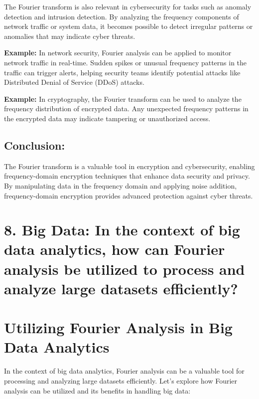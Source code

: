 \documentclass[11pt]{article}
\begin{document}
The Fourier transform is also relevant in cybersecurity for tasks such
as anomaly detection and intrusion detection. By analyzing the frequency
components of network traffic or system data, it becomes possible to
detect irregular patterns or anomalies that may indicate cyber threats.

\textbf{Example:} In network security, Fourier analysis can be applied
to monitor network traffic in real-time. Sudden spikes or unusual
frequency patterns in the traffic can trigger alerts, helping security
teams identify potential attacks like Distributed Denial of Service
(DDoS) attacks.

\textbf{Example:} In cryptography, the Fourier transform can be used to
analyze the frequency distribution of encrypted data. Any unexpected
frequency patterns in the encrypted data may indicate tampering or
unauthorized access.

\hypertarget{conclusion}{%
\subsection{Conclusion:}\label{conclusion}}

The Fourier transform is a valuable tool in encryption and
cybersecurity, enabling frequency-domain encryption techniques that
enhance data security and privacy. By manipulating data in the frequency
domain and applying noise addition, frequency-domain encryption provides
advanced protection against cyber threats.

    \hypertarget{big-data-in-the-context-of-big-data-analytics-how-can-fourier-analysis-be-utilized-to-process-and-analyze-large-datasets-efficiently}{%
\section{8. Big Data: In the context of big data analytics, how can
Fourier analysis be utilized to process and analyze large datasets
efficiently?}\label{big-data-in-the-context-of-big-data-analytics-how-can-fourier-analysis-be-utilized-to-process-and-analyze-large-datasets-efficiently}}

    \hypertarget{utilizing-fourier-analysis-in-big-data-analytics}{%
\section{Utilizing Fourier Analysis in Big Data
Analytics}\label{utilizing-fourier-analysis-in-big-data-analytics}}

In the context of big data analytics, Fourier analysis can be a valuable
tool for processing and analyzing large datasets efficiently. Let's
explore how Fourier analysis can be utilized and its benefits in
handling big data:
\end{document}
